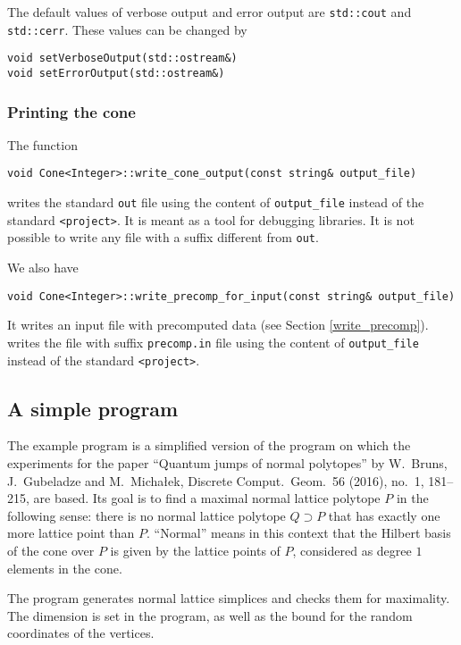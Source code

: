 \begin{small}
The default values of verbose output and error output are \verb|std::cout| and \verb|std::cerr|. These values can be changed by
\begin{Verbatim}
void setVerboseOutput(std::ostream&)
void setErrorOutput(std::ostream&)
\end{Verbatim}

\subsubsection{Printing the cone}

The function
\begin{Verbatim}
void Cone<Integer>::write_cone_output(const string& output_file)
\end{Verbatim}
writes the standard \verb|out| file using the content of \verb|output_file| instead of the standard \verb|<project>|. It is meant as a tool for debugging libraries. It is not possible to write any file with a suffix different from \verb|out|.

We also have
\begin{Verbatim}
void Cone<Integer>::write_precomp_for_input(const string& output_file)
\end{Verbatim}
It writes an input file with precomputed data (see Section \ref{write_precomp}).
writes the file with suffix  \verb|precomp.in| file using the content of \verb|output_file| instead of the standard \verb|<project>|.

\subsection{A simple program}\label{maxsimplex}

The example program is a simplified version of the program on which the experiments for the paper ``Quantum jumps of normal polytopes'' by W.~Bruns, J.~Gubeladze and M.~Micha\l{}ek, Discrete Comput.\ Geom.\ 56 (2016), no.\ 1, 181--215, are based. Its goal is to find a maximal normal lattice polytope $P$ in the following sense: there is no normal lattice polytope $Q\supset P$ that has exactly one more lattice point than $P$. ``Normal'' means in this context that the Hilbert basis of the cone over $P$ is given by the lattice points of $P$, considered as degree $1$ elements in the cone.

The program generates normal lattice simplices and checks them for maximality. The dimension is set in the program, as well as the bound for the random coordinates of the vertices.


\end{small}
